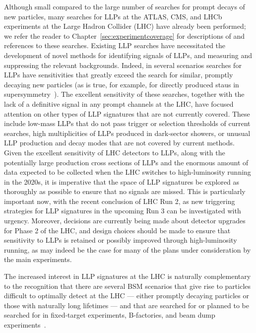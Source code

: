 Although small compared to the large number of searches for prompt decays of new particles, many searches for LLPs at the ATLAS, CMS, and LHCb experiments at the Large Hadron Collider (LHC) have already been performed; we refer the reader to Chapter~\ref{sec:experimentcoverage} for descriptions of and references to these searches. Existing LLP searches have necessitated the development of novel methods for identifying signals of LLPs, and measuring and suppressing the relevant backgrounds.
Indeed, in several scenarios searches for LLPs have sensitivities that greatly exceed the search for similar, promptly decaying new particles (as is true, for example, for directly produced staus in supersymmetry~\cite{CMS-PAS-EXO-16-036}).
The excellent sensitivity of these searches, together with the lack of a definitive signal in any prompt channels at the LHC, have focused attention on other types of LLP signatures that are not currently covered.
These include low-mass LLPs that do not pass trigger or selection thresholds of current searches, high multiplicities of LLPs produced in dark-sector showers, or unusual LLP production and decay modes that are not covered by current methods.
Given the excellent sensitivity of LHC detectors to LLPs, along with the potentially large production cross sections of LLPs and the enormous amount of data expected to be collected when the LHC switches to high-luminosity running in the 2020s, it is imperative that the space of LLP signatures be explored as thoroughly as possible to ensure that no signals are missed.
This is particularly important now, with the recent conclusion of LHC Run 2, as new triggering strategies for LLP signatures in the upcoming Run 3 can be investigated with urgency.
Moreover, decisions are currently being made about detector upgrades for Phase 2 of the LHC, and design choices should be made to ensure that sensitivity to LLPs is retained or possibly improved through high-luminosity running, as may indeed be the case for many of the plans under consideration by the main experiments.

The increased interest in LLP signatures at the LHC is naturally complementary to the recognition that there are several BSM scenarios that give rise to particles difficult to optimally detect at the LHC --- either promptly decaying particles or those with naturally long lifetimes --- and that are searched for or planned to be searched for in fixed-target experiments, B-factories, and beam dump experiments~\cite{Alexander:2016aln,Battaglieri:2017aum,Beacham:2019nyx}.

